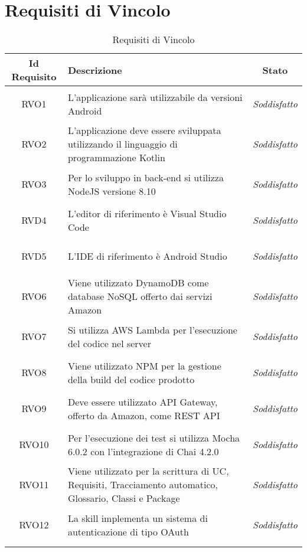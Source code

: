 \section{Requisiti di Vincolo}
\normalsize
\begin{longtable}{|c|>{\centering}m{7cm}|c|}
	\hline
	\textbf{Id Requisito} & \textbf{Descrizione} & \textbf{Stato}\\
	\hline
	\endhead
	\hypertarget{RVO1}{RVO1} & L'applicazione sarà utilizzabile da versioni Android & \textit{Soddisfatto}\\ \hline
	
	\hypertarget{RVO2}{RVO2} & L'applicazione deve essere sviluppata utilizzando il linguaggio di programmazione Kotlin & \textit{Soddisfatto}\\ \hline
	
	\hypertarget{RVO3}{RVO3} & Per lo sviluppo in back-end si utilizza NodeJS versione 8.10 & \textit{Soddisfatto}\\ \hline
	
	\hypertarget{RVD4}{RVD4} & L'editor di riferimento è Visual Studio Code & \textit{Soddisfatto}\\ \hline
	
	\hypertarget{RVD5}{RVD5} & L'IDE di riferimento è Android Studio & \textit{Soddisfatto}\\ \hline
	
	\hypertarget{RVO6}{RVO6} & Viene utilizzato DynamoDB come database NoSQL offerto dai servizi Amazon & \textit{Soddisfatto}\\ \hline
	
	\hypertarget{RVO7}{RVO7} & Si utilizza AWS Lambda per l'esecuzione del codice nel server & \textit{Soddisfatto}\\ \hline
	
	\hypertarget{RVO8}{RVO8} & Viene utilizzato NPM per la gestione della build del codice prodotto & \textit{Soddisfatto}\\ \hline
	
	\hypertarget{RVO9}{RVO9} & Deve essere utilizzato API Gateway, offerto da Amazon, come REST API & \textit{Soddisfatto}\\ \hline
	
	\hypertarget{RVO10}{RVO10} & Per l'esecuzione dei test si utilizza Mocha 6.0.2 con l'integrazione di Chai 4.2.0 & \textit{Soddisfatto}\\ \hline
	
	\hypertarget{RVO11}{RVO11} & Viene utilizzato \glossario{PragmaDB} per la scrittura di UC, Requisiti, Tracciamento automatico, Glossario, Classi e Package & \textit{Soddisfatto}\\ \hline
	
	\hypertarget{RVO12}{RVO12} & La skill implementa un sistema di autenticazione di tipo OAuth & \textit{Soddisfatto}\\ \hline
	
	\caption[Requisiti di Vincolo]{Requisiti di Vincolo}
	\label{tabella:req3}
\end{longtable}
\clearpage

